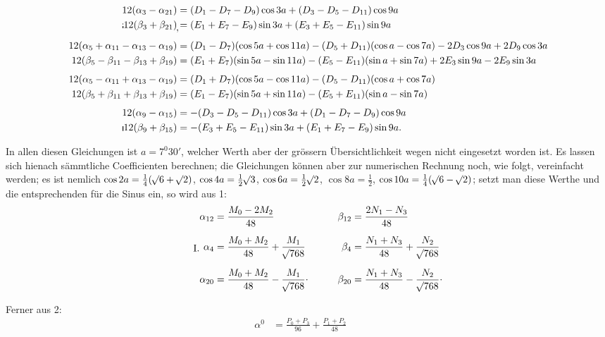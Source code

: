 \begin{landscape}
\[\begin{aligned}
12(\alpha_3-\alpha_{21})&=(D_1-D_7-D_9)\cos3a+(D_3-D_5-D_{11})\cos9a\\
\VthreeBrokenMark12(\beta_3+\beta_{21})\VthreeLowMark&=(E_1+E_7-E_9)\sin3a+(E_3+E_5-E_{11})\sin9a\\[4pt]
12(\alpha_5+\alpha_{11}-\alpha_{13}-\alpha_{19})&=(D_1-D_7)(\cos5a+\cos11a)-(D_5+D_{11})(\cos a-\cos7a)-2D_3\cos9a+2D_9\cos3a\\
12(\beta_5-\beta_{11}-\beta_{13}+\beta_{19})&=(E_1+E_7)(\sin5a-\sin11a)-(E_5-E_{11})(\sin a+\sin7a)+2E_3\sin9a-2E_9\sin3a\\[4pt]
12(\alpha_5-\alpha_{11}+\alpha_{13}-\alpha_{19})&=(D_1+D_7)(\cos5a-\cos11a)-(D_5-D_{11})(\cos a+\cos7a)\\
12(\beta_5+\beta_{11}+\beta_{13}+\beta_{19})&=(E_1-E_7)(\sin5a+\sin11a)-(E_5+E_{11})(\sin a-\sin7a)\\[4pt]
12(\alpha_9-\alpha_{15})&=-(D_3-D_5-D_{11})\cos3a+(D_1-D_7-D_9)\cos9a\\
\VthreeVerticalMark12(\beta_9+\beta_{15})&=-(E_3+E_5-E_{11})\sin3a+(E_1+E_7-E_9)\sin9a.
\end{aligned}
\]
\par\noindent\hspace*{\parindent}In allen diesen Gleichungen ist \(a=7^0 30'\), welcher Werth aber der grössern Übersichtlichkeit wegen nicht eingesetzt worden ist. Es lassen sich hienach sämmtliche Coefficienten berechnen; die Gleichungen können aber zur numerischen Rechnung noch, wie folgt, vereinfacht werden; es ist nemlich \(\cos2a=\tfrac14(\mathord{{}^{}\!\surd}6+\mathord{{}^{}\!\surd}2)\), \(\cos4a=\tfrac12\mathord{{}^{}\!\surd}3\), \(\cos6a=\tfrac12\mathord{{}^{}\!\surd}2\), \(\cos8a=\tfrac12\), \(\cos10a=\tfrac14(\mathord{{}^{}\!\surd}6-\mathord{{}^{}\!\surd}2)\); setzt man diese Werthe und die entsprechenden für die Sinus ein, so wird aus 1:
\[
\tag*{I.}
\begin{aligned}
\alpha_{12}&=\frac{M_0-2M_2}{48}&\qquad\beta_{12}&=\frac{2N_1-N_3}{48}\\[6pt]
\alpha_4&=\frac{M_0+M_2}{48}+\frac{M_1}{\BareRoot{768}}&\beta_4&=\frac{N_1+N_3}{48}+\frac{N_2}{\BareRoot{768}}\\[6pt]
\alpha_{20}&=\frac{M_0+M_2}{48}-\frac{M_1}{\BareRoot{768}}\VthreeRaisedPoint&\beta_{20}&=\frac{N_1+N_3}{48}-\frac{N_2}{\BareRoot{768}}\VthreeRaisedPoint
\end{aligned}
\]
\clearpage{}
\par\noindent\hspace*{\parindent}Ferner aus 2:
\[
\tag*{II.}
\begin{aligned}
\alpha^0&=\frac{P_0+P_3}{96}+\frac{P_1+P_2}{48}&&\\[6pt]

\end{aligned}\]
\end{landscape}
